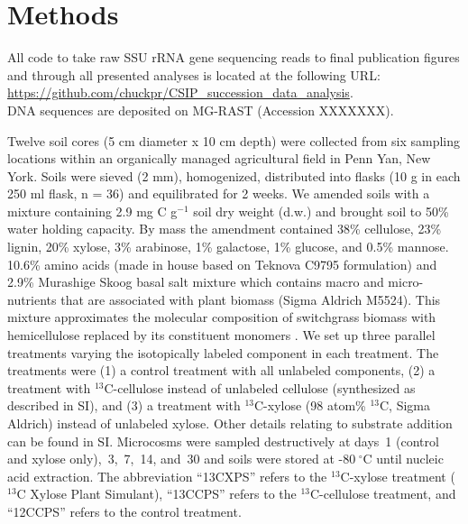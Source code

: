 \section{Methods}
%
All code to take raw SSU rRNA gene sequencing reads to final publication
figures and through all presented analyses is located at the following URL:\\
\url{https://github.com/chuckpr/CSIP_succession_data_analysis}.\\ DNA sequences
are deposited on MG-RAST (Accession XXXXXXX).

Twelve soil cores (5 cm diameter x 10 cm depth) were collected from six 
sampling locations within an organically managed agricultural field in Penn
Yan, New York. Soils were sieved (2 mm), homogenized, distributed into flasks
(10 g in each 250 ml flask, n = 36) and equilibrated for 2 weeks. We amended
soils with a mixture containing 2.9 mg C g$^{-1}$ soil dry weight (d.w.) and
brought soil to 50\% water holding capacity. By mass the amendment
contained 38\% cellulose, 23\% lignin, 20\% xylose, 3\% arabinose, 1\%
galactose, 1\% glucose, and 0.5\% mannose. 10.6\% amino acids (made in house
based on Teknova C9795 formulation) and 2.9\% Murashige Skoog basal salt
mixture which contains macro and micro-nutrients that are associated with plant
biomass (Sigma Aldrich M5524). This mixture approximates the molecular
composition of switchgrass biomass with hemicellulose replaced by its
constituent monomers \citep{Schneckenberger_2008}. We set up three parallel
treatments varying the isotopically labeled component in each treatment. The
treatments were (1) a control treatment with all unlabeled components, (2) a
treatment with $^{13}$C-cellulose instead of unlabeled cellulose (synthesized
as described in SI), and (3) a treatment with $^{13}$C-xylose (98 atom\%
$^{13}$C, Sigma Aldrich) instead of unlabeled xylose. Other details relating to
substrate addition can be found in SI. Microcosms were sampled destructively at
days~1 (control and xylose only),~3,~7,~14, and~30 and soils were stored at
-80 $^{\circ}$C until nucleic acid extraction. The abbreviation “13CXPS” refers
to the $^{13}$C-xylose treatment ($^{13}$C Xylose Plant Simulant), “13CCPS”
refers to the $^{13}$C-cellulose treatment, and “12CCPS” refers to the control
treatment.

